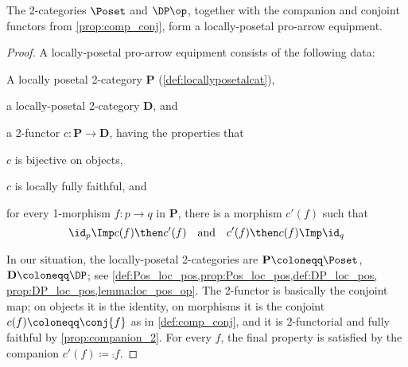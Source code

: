 \begin{theorem}
The 2-categories $\Poset$ and $\DP\op$, together with the companion and conjoint functors from \cref{prop:comp_conj}, form a locally-posetal pro-arrow equipment.
\end{theorem}
\begin{proof}
A locally-posetal pro-arrow equipment consists of the following data:
\begin{compactitem}
	\item A locally posetal 2-category $\mathbf{P}$ (\cref{def:locallyposetalcat}),
	\item a locally-posetal 2-category $\mathbf{D}$, and
	\item a 2-functor $c\colon\mathbf{P}\to\mathbf{D}$, having the properties that
	\begin{compactitem}
		\item $c$ is bijective on objects,
		\item $c$ is locally fully faithful, and
		\item for every 1-morphism $f\colon p\to q$ in $\mathbf{P}$, there is a morphism $c'(f)$ such that
		\begin{equation}
		\id_p\Imp c(f)\then c'(f)\quad\text{and}\quad c'(f)\then c(f)\Imp\id_q
		\end{equation}
	\end{compactitem}
\end{compactitem}
In our situation, the locally-posetal 2-categories are $\mathbf{P}\coloneqq\Poset$, $\mathbf{D}\coloneqq\DP$; see \cref{def:Pos_loc_pos,prop:Pos_loc_pos,def:DP_loc_pos, prop:DP_loc_pos,lemma:loc_pos_op}. The 2-functor is basically the conjoint map; on objects it is the identity, on morphisms it is the conjoint $c(f)\coloneqq\conj{f}$ as in \cref{def:comp_conj}, and it is 2-functorial and fully faithful by \cref{prop:companion_2}. For every $f$, the final property is satisfied by the companion $c'(f)\coloneqq \comp{f}$.
\end{proof}


